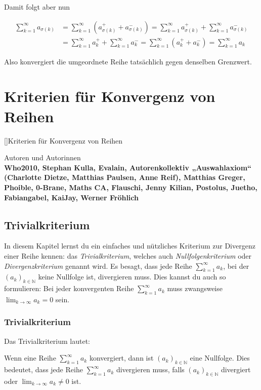 \documentclass[fontsize=9pt,
               parskip=half-,
               DIV=14,
               listof=chapterentry,
               tocflat]{scrbook}
\newenvironment{authors}{\par\vspace*{\fill}\color{white}Autoren und
Autorinnen\\\bfseries}{\clearpage}
\begin{document}
Damit folgt aber nun

\begin{align*}
\sum _{k=1}^{\infty }a_{\sigma (k)}&=\sum _{k=1}^{\infty }(a_{\sigma (k)}^{+}+a_{\sigma (k)}^{-})=\sum _{k=1}^{\infty }a_{\sigma (k)}^{+}+\sum _{k=1}^{\infty }a_{\sigma (k)}^{-}\\[0.3em]&=\sum _{k=1}^{\infty }a_{k}^{+}+\sum _{k=1}^{\infty }a_{k}^{-}=\sum _{k=1}^{\infty }(a_{k}^{+}+a_{k}^{-})=\sum _{k=1}^{\infty }a_{k}
\end{align*}

Also konvergiert die umgeordnete Reihe tatsächlich gegen denselben Grenzwert.

\part{Kriterien für Konvergenz von Reihen}

[]{Kriterien für Konvergenz von Reihen}\begin{authors}
Who2010, Stephan Kulla, Evalain, Autorenkollektiv „Auswahlaxiom“ (Charlotte Dietze, Matthias Paulsen, Anne Reif), Matthias Greger, Phoible, 0-Brane, Maths CA, Flauschi, Jenny Kilian, Postolus, Juetho, Fabiangabel, KaiJay, Werner Fröhlich\end{authors}

\chapter{Trivialkriterium}

In diesem Kapitel lernst du ein einfaches und nützliches Kriterium zur Divergenz einer Reihe kennen: das \emph{Trivialkriterium}, welches auch \emph{Nullfolgenkriterium} oder \emph{Divergenzkriterium} genannt wird. Es besagt, dass jede Reihe $\sum _{k=1}^{\infty }a_{k}$, bei der $(a_{k})_{k\in \mathbb {N} }$ keine Nullfolge ist, divergieren muss. Dies kannst du auch so formulieren: Bei jeder konvergenten Reihe $\sum _{k=1}^{\infty }a_{k}$ muss zwangsweise $\lim _{k\to \infty }a_{k}=0$ sein.

\section{Trivialkriterium}

Das Trivialkriterium lautet:

\begin{theorem*}[Trivialkriterium]
Wenn eine Reihe $\sum _{k=1}^{\infty }a_{k}$ konvergiert, dann ist $(a_{k})_{k\in \mathbb {N} }$ eine Nullfolge. Dies bedeutet, dass jede Reihe $\sum _{k=1}^{\infty }a_{k}$ divergieren muss, falls $(a_{k})_{k\in \mathbb {N} }$ divergiert oder $\lim _{k\to \infty }a_{k}\neq 0$ ist.

\end{theorem*}
\end{document}
